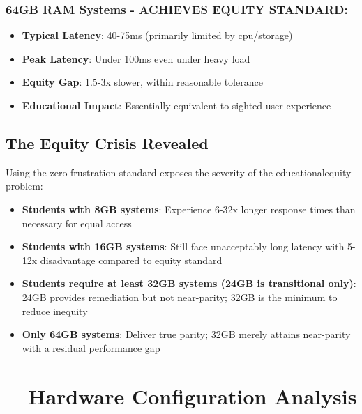 \subsubsection{64GB RAM Systems - ACHIEVES EQUITY STANDARD:}

\begin{itemize}
	\item \textbf{Typical Latency}: 40-75ms (primarily limited by \gls{cpu}/storage)
	\item \textbf{Peak Latency}: Under 100ms even under heavy load
	\item \textbf{Equity Gap}: 1.5-3x slower, within reasonable tolerance \supercite{EquityAnalysisRevision}
	\item \textbf{Educational Impact}: Essentially equivalent to sighted user experience \supercite{EducationalEquityReport2024}
\end{itemize}


\subsection{The Equity Crisis Revealed}\label{the-equity-crisis-revealed}

Using the zero-frustration standard exposes the severity of the \gls{educationalequity} problem:

\begin{itemize}
	\item \textbf{Students with 8GB systems}: Experience 6-32x longer response times than necessary for equal access \supercite{EducationalEquityReport2024}
	\item \textbf{Students with 16GB systems}: Still face unacceptably long latency with 5-12x disadvantage compared to equity standard \supercite{EducationalEquityReport2024}
	\item \textbf{Students require at least 32GB systems (24GB is transitional only)}: 24GB provides remediation but not near-parity; 32GB is the minimum to reduce inequity \supercite{EducationalEquityReport2024}
	\item \textbf{Only 64GB systems}: Deliver true parity; 32GB merely attains near-parity with a residual performance gap \supercite{EducationalEquityReport2024}
\end{itemize}


\hypertarget{\gidx{hardware}{hardware}-configuration-analysis}{}\section{~~Hardware Configuration Analysis}\label{hardware-configuration-analysis}
